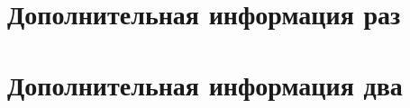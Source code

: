 \appendix


\chapter{Дополнительная информация раз}
\label{sec:raz}

\newpage

\chapter{Дополнительная информация два}
\label{sec:dva}

